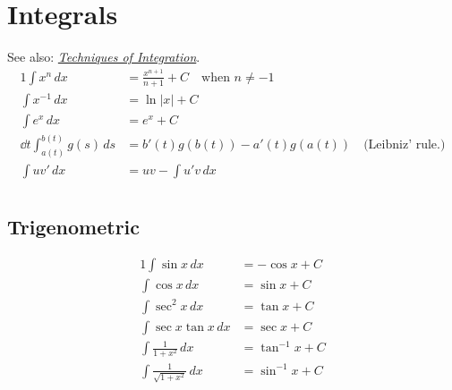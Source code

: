 \documentclass[knowledge]{rbt-mathnotes}
\begin{document}
\section{Integrals}
See also:
\emph{\href{https://www.whitman.edu/mathematics/calculus/calculus_08_Techniques_of_Integration.pdf}{Techniques
of Integration}}.
\begin{alignat*}{1}
  \int x^n\,dx &= \frac{x^{n + 1}}{n + 1} + C \quad \text{when } n \ne -1 \\
  \int x^{-1}\,dx &= \ln|x| + C \\
  \int e^x\,dx &= e^x + C \\
  \dd{t} \int_{a(t)}^{b(t)} g(s)\,ds &= b'(t) g(b(t)) - a'(t) g(a(t))
  \quad\text{(Leibniz' rule.)} \\
  \int uv'\,dx &= uv - \int u'v\,dx \\
\end{alignat*}

\subsection{Trigenometric}
\begin{alignat*}{1}
  \int \sin x\,dx &= -\cos x + C \\
  \int \cos x\,dx &= \sin x + C \\
  \int \sec^2 x\,dx &= \tan x + C \\
  \int \sec x \tan x\,dx &= \sec x + C \\
  \int \frac{1}{1 + x^2}\,dx &= \tan^{-1} x + C \\
  \int \frac{1}{\sqrt{1 + x^2}}\,dx &= \sin^{-1} x + C \\
\end{alignat*}

\printindex
\end{document}

